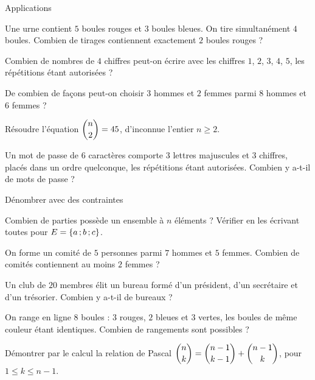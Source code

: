 \begin{exercice}[2]{Applications}
\begin{questions}
  \item Une urne contient $5$ boules rouges et $3$ boules bleues. On tire simultanément $4$ boules. Combien de tirages contiennent
    exactement $2$ boules rouges ?
  \item Combien de nombres de $4$ chiffres peut-on écrire avec les chiffres $1$, $2$, $3$, $4$, $5$, les répétitions étant autorisées ?
  \item De combien de façons peut-on choisir $3$ hommes et $2$ femmes parmi $8$ hommes et $6$ femmes ?
  \item Résoudre l'équation $\dbinom n2=45$, d'inconnue l'entier $n\geq2$.
  \item Un mot de passe de $6$ caractères comporte $3$ lettres majuscules et $3$ chiffres, placés dans un ordre quelconque, les
    répétitions étant autorisées. Combien y a-t-il de mots de passe ?
\end{questions}
\end{exercice}

\begin{exercice}[2]{Dénombrer avec des contraintes}
\begin{questions}
  \item Combien de parties possède un ensemble à $n$ éléments ? Vérifier en les écrivant toutes pour $E=\left\{a\,{;}\, b\,{;}\, c\right\}$.
  \item On forme un comité de $5$ personnes parmi $7$ hommes et $5$ femmes. Combien de comités contiennent au moins $2$ femmes ?
  \item Un club de $20$ membres élit un bureau formé d'un président, d'un secrétaire et d'un trésorier. Combien y a-t-il de bureaux ?
  \item On range en ligne $8$ boules : $3$ rouges, $2$ bleues et $3$ vertes, les boules de même couleur étant identiques. Combien
    de rangements sont possibles ?
  \item Démontrer par le calcul la relation de Pascal $\dbinom nk=\dbinom{n-1}{k-1}+\dbinom{n-1}{k}$, pour $1\leq k\leq n-1$.
\end{questions}
\end{exercice}

